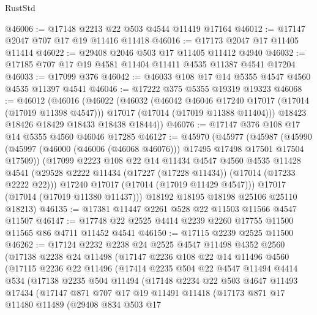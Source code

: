 \begin{lexlean}{RustStd}
\begin{coremodule}
{\begin{coremodule}
{{{{{{{{{{{{{{{{{{{{{{{{{{{{{{{{{{{{{{{{{{{{{{{{{{{{{{{@46006 := @17148 @2213 @22 @503 @4544 @11419 @17164
@46012 := @17147 @2047 @707 @17 @19 @11416 @11418
@46016 := @17173 @2047 @17 @11405 @11414
@46022 := @29408 @2046 @503 @17 @11405 @11412 @4940
@46032 := @17185 @707 @17 @19 @4581 @11404 @11411 @4535 @11387 @4541 @17204
@46033 := @17099 @376
@46042 := @46033 @108 @17 @14 @5355 @4547 @4560 @4535 @11397 @4541
@46046 := @17222 @375 @5355 @19319 @19323
@46068 := @46012
    (@46016
      (@46022
        (@46032
          (@46042 @46046 @17240 @17017 (@17014 (@17019 @11398 @4547)))
          @17017
          (@17014 (@17019 @11388 @11404)))
        @18423
        @18426
        @18429
        @18433
        @18438
        @18444))
@46076 := @17147 @376 @108 @17 @14 @5355 @4560 @46046 @17285
@46127 := @45970
    (@45977
      (@45987
        (@45990 (@45997 (@46000 (@46006 (@46068 @46076))) @17495 @17498 @17501 @17504 @17509))
        (@17099
          @2223
          @108
          @22
          @14
          @11434
          @4547
          @4560
          @4535
          @11428
          @4541
          (@29528 @2222 @11434 (@17227 (@17228 @11434)) (@17014 (@17233 @2222 @22)))
          @17240
          @17017
          (@17014 (@17019 @11429 @4547)))
        @17017
        (@17014 (@17019 @11380 @11437)))
      @18192
      @18195
      @18198
      @25106
      @25110
      @18213)
@46135 := @17381 @11447 @2261 @528 @22 @11503 @11566 @4547 @11507
@46147 := @17748 @22 @2525 @4414 @2239 @2260 @17755 @11500 @11565 @86 @4711 @11452 @4541
@46150 := @17115 @2239 @2525 @11500
@46262 := @17124
    @2232
    @2238
    @24
    @2525
    @4547
    @11498
    @4352
    @2560
    (@17138
      @2238
      @24
      @11498
      (@17147
        @2236
        @108
        @22
        @14
        @11496
        @4560
        (@17115
          @2236
          @22
          @11496
          (@17414
            @2235
            @504
            @22
            @4547
            @11494
            @4414
            @534
            (@17138
              @2235
              @504
              @11494
              (@17148
                @2234
                @22
                @503
                @4647
                @11493
                @17434
                (@17147
                  @871
                  @707
                  @17
                  @19
                  @11491
                  @11418
                  (@17173
                    @871
                    @17
                    @11480
                    @11489
                    (@29408
                      @834
                      @503
                      @17
}}}}}}}}}}}}}}}}}}}}}}}}}}}}}}}}}}}}}}}}}}}}}}}}}}}}}}}
\end{coremodule}}
\end{coremodule}
\end{lexlean}
